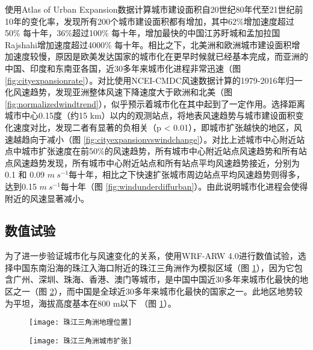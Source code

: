 使用Atlas of Urban Expansion数据计算城市建设面积自20世纪80年代至21世纪前10年的变化率，发现所有200个城市建设面积都有增加，其中62\%增加速度超过50\% 每十年，36\%超过100\% 每十年，增加最快的中国江苏盱城和孟加拉国Rajshahi增加速度超过4000\% 每十年。相比之下，北美洲和欧洲城市建设面积增加速度较慢，原因是欧美发达国家的城市化在更早时候就已经基本完成，而亚洲的中国、印度和东南亚各国，近30多年来城市化进程非常迅速（图 \ref{fig:cityexpansionrate}）。对比使用NCEI-CMDC风速数据计算的1979-2016年归一化风速趋势，发现亚洲整体风速下降速度大于欧洲和北美（图 \ref{fig:normalizedwindtrend}），似乎预示着城市化在其中起到了一定作用。选择距离城市中心0.15度（约15 km）以内的观测站点，将地表风速趋势与城市建设面积变化速度对比，发现二者有显著的负相关（p < 0.01），即城市扩张越快的地区，风速越趋向于减小（图 \ref{fig:cityexpansionvswindchange}）。对比上述城市中心附近站点中城市扩张速度在前50\%的风速趋势，所有城市中心附近站点风速趋势和所有站点风速趋势发现，所有城市中心附近站点和所有站点平均风速趋势接近，分别为0.1 和 0.09 $m ~ s^{-1}$每十年，相比之下快速扩张城市周边站点平均风速趋势则得多，达到0.15 $m ~ s^{-1}$每十年（图 \ref{fig:windunderdiffurban}）。由此说明城市化进程会使得附近的风速显著减小。

\subsection{数值试验}

为了进一步验证城市化与风速变化的关系，使用WRF-ARW 4.0进行数值试验，选择中国东南沿海的珠江入海口附近的珠江三角洲作为模拟区域（图 \ref{fig:PRDlocation}），因为它包含广州、深圳、珠海、香港、澳门等城市，是中国中国近30多年来城市化最快的地区之一（图 \ref{fig:PRDcityexpand}），而中国是全球近30多年来城市化最快的国家之一。此地区地势较为平坦，海拔高度基本在800 m以下 （图 \ref{fig:PRDlocation}）。

\begin{figure}[!htbp]
    \centering
    \texttt{[image: 珠江三角洲地理位置]}
    \label{fig:PRDlocation}
\end{figure}

\begin{figure}[!t]
    \centering
    \texttt{[image: 珠江三角洲城市扩张]}
    \label{fig:PRDcityexpand}
\end{figure}

